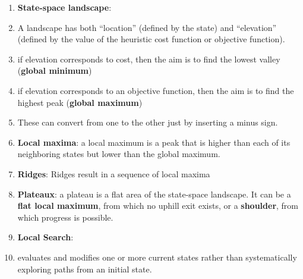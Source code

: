 \begin{enumerate}
    \item[] {\fontsize{18}{18} \textbf{State-space landscape}}:
    
    \item A landscape has both “location” (defined by the state) and “elevation” (defined by the value of the heuristic cost function or objective function).
    \hfill \cite{ai/book/Artificial-Intelligence-A-Modern-Approach/Russell-Norvig}

    \item if elevation corresponds to cost, then the aim is to find the lowest valley (\textbf{global minimum})
    \hfill \cite{ai/book/Artificial-Intelligence-A-Modern-Approach/Russell-Norvig}

    \item if elevation corresponds to an objective function, then the aim is to find the highest peak (\textbf{global maximum})
    \hfill \cite{ai/book/Artificial-Intelligence-A-Modern-Approach/Russell-Norvig}

    \item These can convert from one to the other just by inserting a minus sign.
    \hfill \cite{ai/book/Artificial-Intelligence-A-Modern-Approach/Russell-Norvig}


    \item \textbf{Local maxima}: a local maximum is a peak that is higher than each of its neighboring states but lower than the global maximum.
    \hfill \cite{ai/book/Artificial-Intelligence-A-Modern-Approach/Russell-Norvig}

    \item \textbf{Ridges}:  Ridges result in a sequence of local maxima
    \hfill \cite{ai/book/Artificial-Intelligence-A-Modern-Approach/Russell-Norvig}

    \item \textbf{Plateaux}: a plateau is a flat area of the state-space landscape. It can be a \textbf{flat local maximum}, from which no uphill exit exists, or a \textbf{shoulder}, from which progress is possible.
    \hfill \cite{ai/book/Artificial-Intelligence-A-Modern-Approach/Russell-Norvig}







    \vspace{1cm}
    \item[] {\fontsize{18}{18} \textbf{Local Search}}:

    \item evaluates and modifies one or more current states rather than systematically exploring paths from an initial state.
    \hfill \cite{ai/book/Artificial-Intelligence-A-Modern-Approach/Russell-Norvig}


\end{enumerate}
